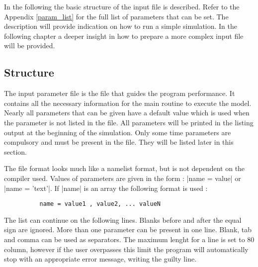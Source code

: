 
%
%
%
%
%
%
%

In the following the basic structure of the input file is described. Refer to the Appendix \ref{param_list}
for the full list of parameters that can be set. The description will provide indication on how to run a simple simulation.
In the following chapter a deeper insight in how to prepare a more complex input file will be provided.


\subsection{Structure}

The input parameter file is the file that guides the program performance. It
contains all the necessary information for the main routine to execute
the model. Nearly all parameters that can be given have a default value
which is used when the parameter is not listed in the file. All parameters
will be printed in the listing output at the beginning of the simulation.
Only some time parameters are compulsory and must be present in the file.
They will be listed later in this section.

The file format looks much like a namelist format, but is
not dependent on the compiler used. Values of parameters are given
in the form :
|name = value|  or  |name = 'text'|.  If |name|
is an array the following format is used :
\begin{verbatim}
          name = value1 , value2, ... valueN
\end{verbatim}
The list can continue on the following lines. Blanks before and after
the equal sign are ignored. More than one parameter can be present
in one line. Blank, tab and comma can be used as separators.
The maximum lenght for a line is set to 80 column, however if the user
overpasses this limit the program will automatically stop with an
appropriate error message, writing the guilty line.

